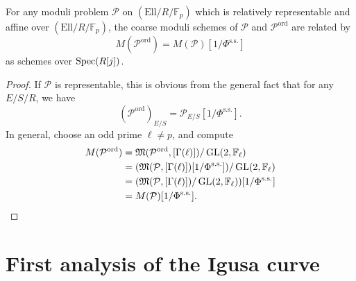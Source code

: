 \begin{kcor}\label{cor:12.5.5}
For any moduli problem $\mathcal{P}$ on $(\mathrm{Ell}/R/\mathbb{F}_p)$ which is relatively representable and affine over $(\mathrm{Ell}/R/\mathbb{F}_p)$, the coarse moduli schemes of $\mathcal{P}$ and $\mathcal{P}^{\mathrm{ord}}$ are related by
\[
M(\mathcal{P}^{\mathrm{ord}}) = M(\mathcal{P})[1/\Phi^{\mathrm{s.s.}}]
\]
as schemes over $\operatorname{Spec}(R[j])$.
\end{kcor}

\begin{proof}
If $\mathcal{P}$ is representable, this is obvious from the general fact that for any $E/S/R$, we have
\[
(\mathcal{P}^{\mathrm{ord}})_{E/S} = \mathcal{P}_{E/S}[1/\Phi^{\mathrm{s.s.}}] .
\]
In general, choose an odd prime $\ell \neq p$, and compute
\[
\begin{aligned}
M(\mathcal{P}^{\mathrm{ord}}) &= \mathfrak{M}(\mathcal{P}^{\mathrm{ord}}, [\Gamma(\ell)]) / \operatorname{GL}(2,\mathbb{F}_\ell) \\
&= (\mathfrak{M}(\mathcal{P}, [\Gamma(\ell)])[1/\Phi^{\mathrm{s.s.}}]) / \operatorname{GL}(2,\mathbb{F}_\ell) \\
&= (\mathfrak{M}(\mathcal{P}, [\Gamma(\ell)]) / \operatorname{GL}(2,\mathbb{F}_\ell))[1/\Phi^{\mathrm{s.s.}}] \\
&= M(\mathcal{P})[1/\Phi^{\mathrm{s.s.}}] . \qedhere
\end{aligned}
\]
\end{proof}

\section{First analysis of the Igusa curve}
\label{sec:12.6}

